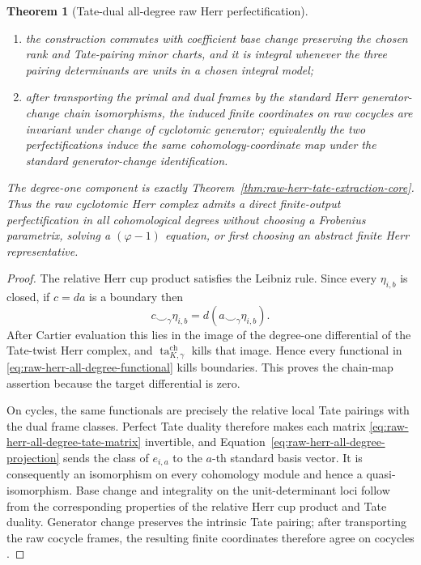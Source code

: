 \documentclass[11pt]{article}
\newtheorem{theorem}{Theorem}[section]
\theoremstyle{definition}
\begin{document}
\begin{theorem}[Tate-dual all-degree raw Herr perfectification]
\begin{enumerate}[label=\textnormal{(\roman*)}]
\item the construction commutes with coefficient base change preserving the chosen rank and Tate-pairing minor charts, and it is integral whenever the three pairing determinants are units in a chosen integral model;
\item after transporting the primal and dual frames by the standard Herr generator-change chain isomorphisms, the induced finite coordinates on raw cocycles are invariant under change of cyclotomic generator; equivalently the two perfectifications induce the same cohomology-coordinate map under the standard generator-change identification.
\end{enumerate}
The degree-one component is exactly Theorem~\ref{thm:raw-herr-tate-extraction-core}.  Thus the raw cyclotomic Herr complex admits a direct finite-output perfectification in all cohomological degrees without choosing a Frobenius parametrix, solving a $(\varphi-1)$ equation, or first choosing an abstract finite Herr representative.
\end{theorem}

\begin{proof}
The relative Herr cup product satisfies the Leibniz rule.  Since every $\eta_{i,b}$ is closed, if $c=d a$ is a boundary then
\[
 c\smile_\gamma\eta_{i,b}
 =d(a\smile_\gamma\eta_{i,b}).
\]
After Cartier evaluation this lies in the image of the degree-one differential of the Tate-twist Herr complex, and $\operatorname{ta}^{\mathrm{ch}}_{K,\gamma}$ kills that image.  Hence every functional in \eqref{eq:raw-herr-all-degree-functional} kills boundaries.  This proves the chain-map assertion because the target differential is zero.

On cycles, the same functionals are precisely the relative local Tate pairings with the dual frame classes.  Perfect Tate duality therefore makes each matrix \eqref{eq:raw-herr-all-degree-tate-matrix} invertible, and Equation~\eqref{eq:raw-herr-all-degree-projection} sends the class of $e_{i,a}$ to the $a$-th standard basis vector.  It is consequently an isomorphism on every cohomology module and hence a quasi-isomorphism.  Base change and integrality on the unit-determinant loci follow from the corresponding properties of the relative Herr cup product and Tate duality.  Generator change preserves the intrinsic Tate pairing; after transporting the raw cocycle frames, the resulting finite coordinates therefore agree on cocycles \cite{KPXFamilies,LiuCohomology}.
\end{proof}
\end{document}
